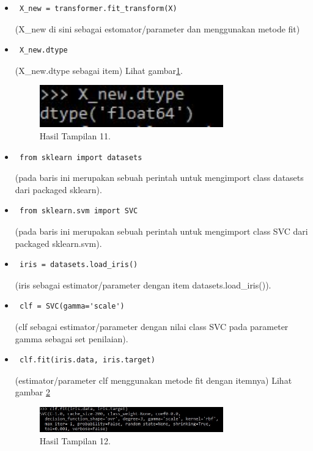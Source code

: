 \begin{enumerate}
\begin{itemize}
\item\begin{verbatim} X_new = transformer.fit_transform(X)\end{verbatim}(X\_new di sini sebagai estomator/parameter dan menggunakan metode fit)
\item\begin{verbatim} X_new.dtype\end{verbatim}(X\_new.dtype sebagai item) Lihat gambar\ref{20}.
\begin{figure}[!htbp]\centerline{\includegraphics[width=0.75\textwidth]{figures/huda/20.JPG}}\caption{Hasil Tampilan 11.}\label{20}\end{figure}
\item\begin{verbatim} from sklearn import datasets\end{verbatim}(pada baris ini merupakan sebuah perintah untuk mengimport class datasets dari packaged sklearn).
\item\begin{verbatim} from sklearn.svm import SVC\end{verbatim}(pada baris ini merupakan sebuah perintah untuk mengimport class SVC dari packaged sklearn.svm).
\item\begin{verbatim} iris = datasets.load_iris()\end{verbatim}(iris sebagai estimator/parameter dengan item datasets.load\_iris()).
\item\begin{verbatim} clf = SVC(gamma='scale')\end{verbatim}(clf sebagai estimator/parameter dengan nilai class SVC pada parameter gamma sebagai set penilaian).
\item\begin{verbatim} clf.fit(iris.data, iris.target)\end{verbatim}(estimator/parameter clf menggunakan metode fit dengan itemnya) Lihat gambar \ref{21}
\begin{figure}[!htbp]\centerline{\includegraphics[width=0.75\textwidth]{figures/huda/21.JPG}}\caption{Hasil Tampilan 12.}\label{21}\end{figure}

\end{itemize}
\end{enumerate}
